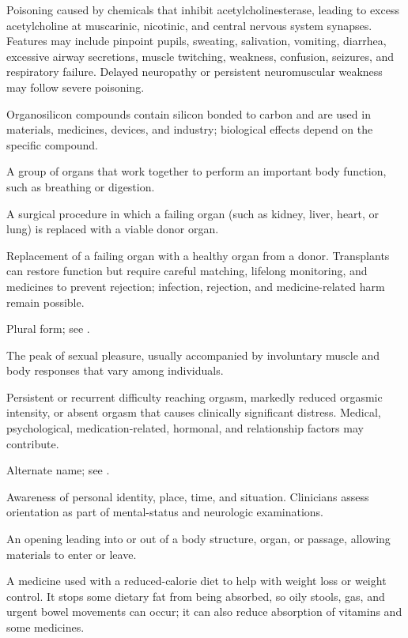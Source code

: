  Poisoning caused by chemicals that inhibit acetylcholinesterase, leading to excess
acetylcholine at muscarinic, nicotinic, and central nervous system synapses. Features may include pinpoint pupils,
sweating, salivation, vomiting, diarrhea, excessive airway secretions, muscle twitching, weakness, confusion,
seizures, and respiratory failure. Delayed neuropathy or persistent neuromuscular weakness may follow severe poisoning.

 Organosilicon compounds contain silicon bonded to carbon and are used in materials, medicines, devices, and industry; biological effects depend on the specific compound.

 A group of organs that work together to perform an important body function, such as breathing or digestion.

 A surgical procedure in which a failing organ (such as kidney, liver, heart, or lung) is replaced with a viable donor organ.

 Replacement of a failing organ with a healthy organ from a donor. Transplants can restore function but require careful matching, lifelong monitoring, and medicines to prevent rejection; infection, rejection, and medicine-related harm remain possible.

 Plural form; see .

 The peak of sexual pleasure, usually accompanied by involuntary muscle and body responses that vary among individuals.

 Persistent or recurrent difficulty reaching orgasm, markedly reduced orgasmic intensity, or absent orgasm that causes clinically significant distress. Medical, psychological, medication-related, hormonal, and relationship factors may contribute.

 Alternate name; see .

 Awareness of personal identity, place, time, and situation. Clinicians assess orientation as part of mental-status and neurologic examinations.

 An opening leading into or out of a body structure, organ, or passage, allowing materials to enter or leave.

 A medicine used with a reduced-calorie diet to help with weight loss or weight control. It stops some dietary fat from being absorbed, so oily stools, gas, and urgent bowel movements can occur; it can also reduce absorption of vitamins and some medicines.

